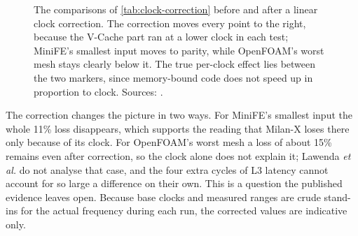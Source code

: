 \begin{figure}[htbp]
\centering
{}
\caption[Comparisons before and after a linear clock correction]{The comparisons of \cref{tab:clock-correction} before and after a linear clock correction. The correction moves every point to the right, because the V-Cache part ran at a lower clock in each test; MiniFE's smallest input moves to parity, while OpenFOAM's worst mesh stays clearly below it. The true per-clock effect lies between the two markers, since memory-bound code does not speed up in proportion to clock. Sources: \cite{lawendaEvaluatingImpactL32025,cozmaDeepDivingZen2022,domkeLocusPerformanceQuantifying2023}.}
\label{fig:clock-correction}
\end{figure}


The correction changes the picture in two ways. For MiniFE's smallest input the whole 11\% loss disappears, which supports the reading that Milan-X loses there only because of its clock. For OpenFOAM's worst mesh a loss of about 15\% remains even after correction, so the clock alone does not explain it; Lawenda \emph{et al.} do not analyse that case, and the four extra cycles of L3 latency cannot account for so large a difference on their own. This is a question the published evidence leaves open. Because base clocks and measured ranges are crude stand-ins for the actual frequency during each run, the corrected values are indicative only.

